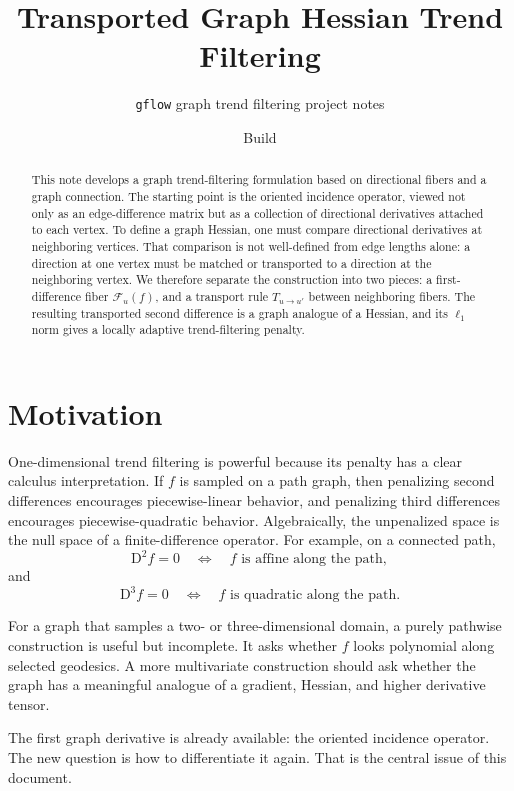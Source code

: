 \documentclass[11pt]{article}
\title{Transported Graph Hessian Trend Filtering}
\author{\texttt{gflow} graph trend filtering project notes}
\date{Build \reportbuilddatetime}
\newcommand{\F}{\mathcal F}
\newcommand{\D}{\mathrm D}
\begin{document}
\maketitle

\begin{abstract}
This note develops a graph trend-filtering formulation based on directional
fibers and a graph connection.  The starting point is the oriented incidence
operator, viewed not only as an edge-difference matrix but as a collection of
directional derivatives attached to each vertex.  To define a graph Hessian, one
must compare directional derivatives at neighboring vertices.  That comparison
is not well-defined from edge lengths alone: a direction at one vertex must be
matched or transported to a direction at the neighboring vertex.  We therefore
separate the construction into two pieces: a first-difference fiber
\(\F_u(f)\), and a transport rule \(T_{u\to u'}\) between neighboring fibers.
The resulting transported second difference is a graph analogue of a Hessian,
and its \(\ell_1\) norm gives a locally adaptive trend-filtering penalty.
\end{abstract}

\section{Motivation}

One-dimensional trend filtering is powerful because its penalty has a clear
calculus interpretation.  If \(f\) is sampled on a path graph, then penalizing
second differences encourages piecewise-linear behavior, and penalizing third
differences encourages piecewise-quadratic behavior.  Algebraically, the
unpenalized space is the null space of a finite-difference operator.  For
example, on a connected path,
\[
  \D^2 f = 0
  \quad\Longleftrightarrow\quad
  f \text{ is affine along the path},
\]
and
\[
  \D^3 f = 0
  \quad\Longleftrightarrow\quad
  f \text{ is quadratic along the path}.
\]

For a graph that samples a two- or three-dimensional domain, a purely
pathwise construction is useful but incomplete.  It asks whether \(f\) looks
polynomial along selected geodesics.  A more multivariate construction should
ask whether the graph has a meaningful analogue of a gradient, Hessian, and
higher derivative tensor.

The first graph derivative is already available: the oriented incidence
operator.  The new question is how to differentiate it again.  That is the
central issue of this document.
\end{document}

